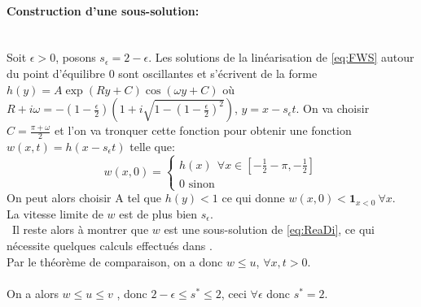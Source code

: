 \documentclass[11pt]{article}
\begin{document}
\paragraph{Construction d'une sous-solution:} \ \\
Soit $\epsilon > 0 $, posons $s_\epsilon = 2 - \epsilon $. Les solutions de la linéarisation de \eqref{eq:FWS} autour du point d’équilibre 0 sont oscillantes et s’écrivent de la forme $h(y)= A\exp(Ry+C)\cos(\omega y+C)$ où \\ $R + i\omega = -(1-\frac{\epsilon}{2})(1+i\sqrt{1-(1-\frac{\epsilon}{2})^2})$, $y= x- s_\epsilon t$. On va choisir $C = \frac{\pi + \omega}{2}$ et l'on va tronquer cette fonction pour obtenir une fonction $w(x,t)= h(x-s_\epsilon t )$ telle que:
\[ w(x,0)  = \begin{cases} h(x) \ \ \forall x \in [-\frac{1}{2} - \pi, -\frac{1}{2}] \\ 0 \text{    sinon}\end{cases}
\]
On peut alors choisir A tel que $h(y)<1$ ce qui donne $w(x,0)< \mathbf{1}_{x<0} \ \forall x$.\\
 La vitesse limite de $w$ est de plus bien $s_\epsilon$.\\\
Il reste alors à montrer que $w$ est une sous-solution de \eqref{eq:ReaDi}, ce qui nécessite quelques calculs effectués dans %
.\\
Par le théorème de comparaison, on a donc $w\leq u $, $\forall x, t>0$.
\\
\ \\
On a alors $w\leq u\leq v$ , donc $ 2-\epsilon \leq s^* \leq 2 $, ceci $\forall \epsilon$ donc $s^* =2$. 
\ifdefined\COMPLETE
\else
\end{document}
